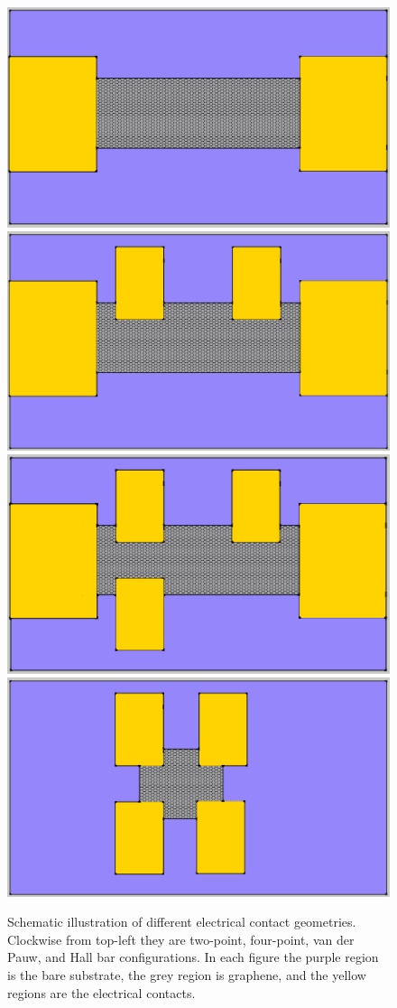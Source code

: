 \documentclass[edeposit,fullpage,draftthesis]{uiucthesis2009}
\begin{document}
            
         \begin{figure}
            \centering
            \includegraphics[width=0.4\linewidth]{images/experimentaltechniques/2pt-crop.png}
            \hspace{0.1\linewidth}
            \includegraphics[width=0.4\linewidth]{images/experimentaltechniques/4pt-crop.png}\\
            \vspace{0.04\linewidth}
            \includegraphics[width=0.4\linewidth]{images/experimentaltechniques/hallbar-crop.png}
            \hspace{0.1\linewidth}
            \includegraphics[width=0.4\linewidth]{images/experimentaltechniques/vdp-crop.png}\\
            \caption[Electronic contact configurations]{
                Schematic illustration of different electrical contact geometries. Clockwise from top-left
                they are two-point, four-point, van der Pauw, and Hall bar configurations. In each figure
                the purple region is the bare substrate, the grey region is graphene, and the yellow
                regions are the electrical contacts.
                }
            \label{fig:contact_config}
        \end{figure}
            
\end{document}
